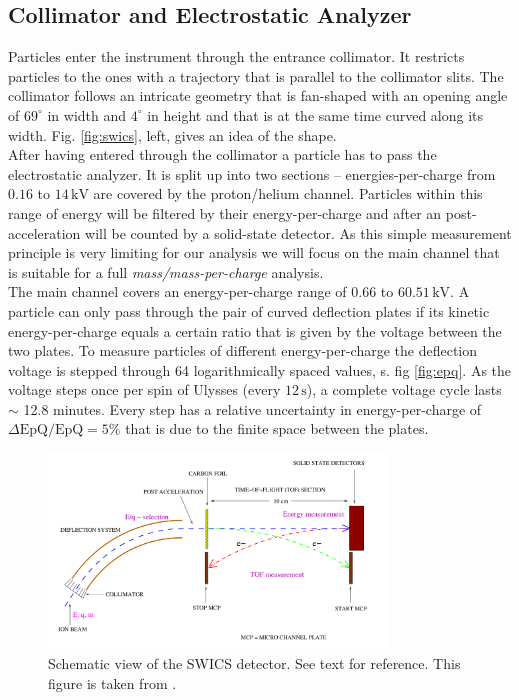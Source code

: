 \subsection{Collimator and Electrostatic Analyzer}
\label{sec:EpQ}
Particles enter the instrument through the entrance collimator. It restricts particles to the ones with a trajectory that is parallel to the collimator slits.  The collimator follows an intricate geometry that is fan-shaped with an opening angle of $69^\circ$ in width and $4^\circ$ in height and that is at the same time curved along its width. Fig. \ref{fig:swics}, left,  gives an idea of the shape.\\
After having entered through the collimator a particle has to pass the electrostatic analyzer. It is split up into two sections -- energies-per-charge from $0.16$ to $14\,\mathrm{kV}$ are covered by the proton/helium channel. Particles within this range of energy will be filtered by their energy-per-charge and after an post-acceleration will be counted by a solid-state detector. As this simple measurement principle is very limiting for our analysis we will focus on the main channel that is suitable for a full \textit{mass/mass-per-charge} analysis.\\
The main channel covers an energy-per-charge range of $0.66$ to $60.51\,\mathrm{kV}$. A particle can only pass through the pair of curved deflection plates if its kinetic energy-per-charge equals a certain ratio that is given by the voltage between the two plates. To measure particles of different energy-per-charge the deflection voltage is stepped through 64 logarithmically spaced values, s. fig \ref{fig:epq}. As the voltage steps once per spin of Ulysses (every $12\,\mathrm{s}$), a complete voltage cycle lasts $\sim$ 12.8 minutes. 
Every step has a relative uncertainty in energy-per-charge of $\Delta \mathrm{EpQ / EpQ = 5\%}$  that is due to the finite space between the plates.
%
%
%
\begin{figure}[h]
	\includegraphics[width=0.8\textwidth]{Figures/Lars_Swics.png}
	\centering
	\caption{Schematic view of the SWICS detector. See text for reference. This figure is taken from \citet{lars-phd}.}
	\label{fig:lars_swics}
\end{figure}

